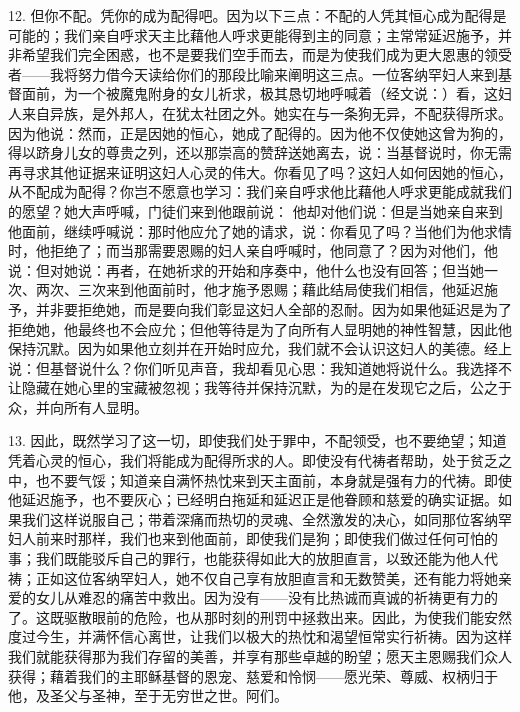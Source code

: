 12. 但你不配。凭你的成为配得吧。因为以下三点：不配的人凭其恒心成为配得是可能的；我们亲自呼求天主比藉他人呼求更能得到主的同意；主常常延迟施予，并非希望我们完全困惑，也不是要我们空手而去，而是为使我们成为更大恩惠的领受者——我将努力借今天读给你们的那段比喻来阐明这三点。一位客纳罕妇人来到基督面前，为一个被魔鬼附身的女儿祈求，极其恳切地呼喊着（经文说：）看，这妇人来自异族，是外邦人，在犹太社团之外。她实在与一条狗无异，不配获得所求。因为他说：然而，正是因她的恒心，她成了配得的。因为他不仅使她这曾为狗的，得以跻身儿女的尊贵之列，还以那崇高的赞辞送她离去，说：当基督说时，你无需再寻求其他证据来证明这妇人心灵的伟大。你看见了吗？这妇人如何因她的恒心，从不配成为配得？你岂不愿意也学习：我们亲自呼求他比藉他人呼求更能成就我们的愿望？她大声呼喊，门徒们来到他跟前说： 他却对他们说：但是当她亲自来到他面前，继续呼喊说：那时他应允了她的请求，说：你看见了吗？当他们为他求情时，他拒绝了；而当那需要恩赐的妇人亲自呼喊时，他同意了？因为对他们，他说：但对她说：再者，在她祈求的开始和序奏中，他什么也没有回答；但当她一次、两次、三次来到他面前时，他才施予恩赐；藉此结局使我们相信，他延迟施予，并非要拒绝她，而是要向我们彰显这妇人全部的忍耐。因为如果他延迟是为了拒绝她，他最终也不会应允；但他等待是为了向所有人显明她的神性智慧，因此他保持沉默。因为如果他立刻并在开始时应允，我们就不会认识这妇人的美德。经上说：但基督说什么？你们听见声音，我却看见心思：我知道她将说什么。我选择不让隐藏在她心里的宝藏被忽视；我等待并保持沉默，为的是在发现它之后，公之于众，并向所有人显明。\par

13. 因此，既然学习了这一切，即使我们处于罪中，不配领受，也不要绝望；知道凭着心灵的恒心，我们将能成为配得所求的人。即使没有代祷者帮助，处于贫乏之中，也不要气馁；知道亲自满怀热忱来到天主面前，本身就是强有力的代祷。即使他延迟施予，也不要灰心；已经明白拖延和延迟正是他眷顾和慈爱的确实证据。如果我们这样说服自己；带着深痛而热切的灵魂、全然激发的决心，如同那位客纳罕妇人前来时那样，我们也来到他面前，即使我们是狗；即使我们做过任何可怕的事；我们既能驳斥自己的罪行，也能获得如此大的放胆直言，以致还能为他人代祷；正如这位客纳罕妇人，她不仅自己享有放胆直言和无数赞美，还有能力将她亲爱的女儿从难忍的痛苦中救出。因为没有——没有比热诚而真诚的祈祷更有力的了。这既驱散眼前的危险，也从那时刻的刑罚中拯救出来。因此，为使我们能安然度过今生，并满怀信心离世，让我们以极大的热忱和渴望恒常实行祈祷。因为这样我们就能获得那为我们存留的美善，并享有那些卓越的盼望；愿天主恩赐我们众人获得；藉着我们的主耶稣基督的恩宠、慈爱和怜悯——愿光荣、尊威、权柄归于他，及圣父与圣神，至于无穷世之世。阿们。\par

